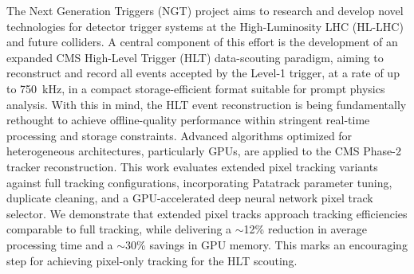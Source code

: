The Next Generation Triggers (NGT) project aims to research and develop novel technologies for detector trigger systems at the High-Luminosity LHC (HL-LHC) and future colliders.
A central component of this effort is the development of an expanded CMS High-Level Trigger (HLT) data-scouting paradigm, aiming to reconstruct and record all events accepted by the Level-1 trigger, at a rate of up to \SI{750}{\kilo\hertz}, in a compact storage-efficient format suitable for prompt physics analysis.
With this in mind, the HLT event reconstruction is being fundamentally rethought to achieve offline-quality performance within stringent real-time processing and storage constraints.
Advanced algorithms optimized for heterogeneous architectures, particularly GPUs, are applied to the CMS Phase-2 tracker reconstruction.
This work evaluates extended pixel tracking variants against full tracking configurations, incorporating Patatrack parameter tuning, duplicate cleaning, and a GPU-accelerated deep neural network pixel track selector.
We demonstrate that extended pixel tracks approach tracking  efficiencies comparable to full tracking, while delivering a $\sim$12\% reduction in average processing time and a $\sim$30\% savings in GPU memory.
This marks an encouraging step for achieving pixel-only tracking for the HLT scouting.
